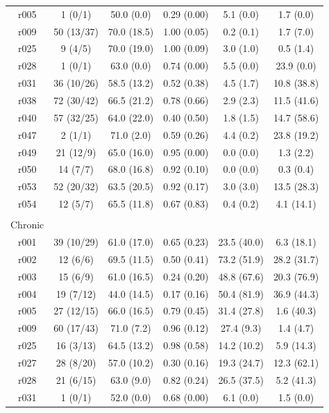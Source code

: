 \documentclass[phd,tocprelim]{cornell}
\begin{document}
\begin{longtable}{c|c|c|c|c|c}
\hline\hline
r005 & 1 (0/1) & 50.0 (0.0) & 0.29 (0.00) & 5.1 (0.0) & 1.7 (0.0) \\
r009 & 50 (13/37) & 70.0 (18.5) & 1.00 (0.05) & 0.2 (0.1) & 1.7 (7.0) \\
r025 & 9 (4/5) & 70.0 (19.0) & 1.00 (0.09) & 3.0 (1.0) & 0.5 (1.4) \\
r028 & 1 (0/1) & 63.0 (0.0) & 0.74 (0.00) & 5.5 (0.0) & 23.9 (0.0) \\
r031 & 36 (10/26) & 58.5 (13.2) & 0.52 (0.38) & 4.5 (1.7) & 10.8 (38.8)  \\
r038 & 72 (30/42) & 66.5 (21.2) & 0.78 (0.66) & 2.9 (2.3) & 11.5 (41.6)  \\
r040 & 57 (32/25) & 64.0 (22.0) & 0.40 (0.50) & 1.8 (1.5) & 14.7 (58.6)  \\
r047 & 2 (1/1) & 71.0 (2.0) & 0.59 (0.26) & 4.4 (0.2) & 23.8 (19.2)  \\
r049 & 21 (12/9) & 65.0 (16.0) & 0.95 (0.00) & 0.0 (0.0) & 1.3 (2.2)  \\
r050 & 14 (7/7) & 68.0 (16.8) & 0.92 (0.10) & 0.0 (0.0) & 0.3 (0.4)  \\
r053 & 52 (20/32) & 63.5 (20.5) & 0.92 (0.17) & 3.0 (3.0) & 13.5 (28.3)  \\
r054 & 12 (5/7) & 65.5 (11.8) & 0.67 (0.83) & 0.4 (0.2) & 4.1 (14.1)  \\
 & & & & & \\
Chronic & & & & & \\
\hline\hline
r001 & 39 (10/29) & 61.0 (17.0) & 0.65 (0.23) & 23.5 (40.0) & 6.3 (18.1)  \\
r002 & 12 (6/6) & 69.5 (11.5) & 0.50 (0.41) & 73.2 (51.9) & 28.2 (31.7)  \\
r003 & 15 (6/9) & 61.0 (16.5) & 0.24 (0.20) & 48.8 (67.6) & 20.3 (76.9)  \\
r004 & 19 (7/12) & 44.0 (14.5) & 0.17 (0.16) & 50.4 (81.9) & 36.9 (44.3)  \\
r005 & 27 (12/15) & 66.0 (16.5) & 0.79 (0.45) & 31.4 (27.8) & 1.6 (40.3)  \\
r009 & 60 (17/43) & 71.0 (7.2) & 0.96 (0.12) & 27.4 (9.3) & 1.4 (4.7) \\
r025 & 16 (3/13) & 64.5 (13.2) & 0.98 (0.58) & 14.2 (10.2) & 5.9 (14.3)  \\
r027 & 28 (8/20) & 57.0 (10.2) & 0.30 (0.16) & 19.3 (24.7) & 12.3 (62.1)  \\
r028 & 21 (6/15) & 63.0 (9.0) & 0.82 (0.24) & 26.5 (37.5) & 5.2 (41.3)  \\
r031 & 1 (0/1) & 52.0 (0.0) & 0.68 (0.00) & 6.1 (0.0) & 1.5 (0.0)  \\

\end{longtable}
\end{document}
